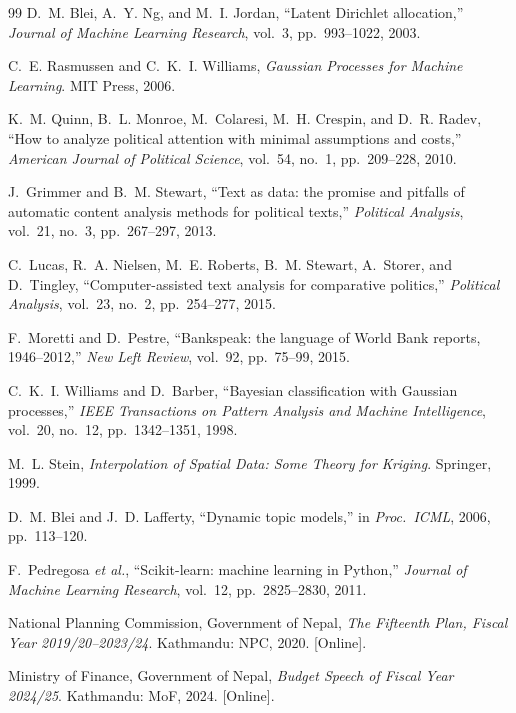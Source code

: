 \documentclass[conference]{IEEEtran}
\begin{document}
\begin{thebibliography}{99}
 D.~M. Blei, A.~Y. Ng, and M.~I. Jordan,
``Latent Dirichlet allocation,'' \emph{Journal of Machine Learning
Research}, vol.~3, pp.~993--1022, 2003.

 C.~E. Rasmussen and C.~K.~I. Williams,
\emph{Gaussian Processes for Machine Learning}. MIT Press, 2006.

 K.~M. Quinn, B.~L. Monroe, M.~Colaresi,
M.~H. Crespin, and D.~R. Radev, ``How to analyze political attention
with minimal assumptions and costs,'' \emph{American Journal of
Political Science}, vol.~54, no.~1, pp.~209--228, 2010.

 J.~Grimmer and B.~M. Stewart, ``Text as
data: the promise and pitfalls of automatic content analysis methods
for political texts,'' \emph{Political Analysis}, vol.~21, no.~3,
pp.~267--297, 2013.

 C.~Lucas, R.~A. Nielsen, M.~E. Roberts,
B.~M. Stewart, A.~Storer, and D.~Tingley, ``Computer-assisted text
analysis for comparative politics,'' \emph{Political Analysis},
vol.~23, no.~2, pp.~254--277, 2015.

 F.~Moretti and D.~Pestre, ``Bankspeak: the
language of World Bank reports, 1946--2012,'' \emph{New Left Review},
vol.~92, pp.~75--99, 2015.

 C.~K.~I. Williams and D.~Barber,
``Bayesian classification with Gaussian processes,'' \emph{IEEE
Transactions on Pattern Analysis and Machine Intelligence}, vol.~20,
no.~12, pp.~1342--1351, 1998.

 M.~L. Stein,
\emph{Interpolation of Spatial Data: Some Theory for Kriging}.
Springer, 1999.

 D.~M. Blei and J.~D. Lafferty, ``Dynamic
topic models,'' in \emph{Proc.\ ICML}, 2006, pp.~113--120.

 F.~Pedregosa \textit{et al.},
``Scikit-learn: machine learning in Python,'' \emph{Journal of
Machine Learning Research}, vol.~12, pp.~2825--2830, 2011.

 National Planning Commission, Government of Nepal,
\emph{The Fifteenth Plan, Fiscal Year 2019/20--2023/24}.
Kathmandu: NPC, 2020. [Online].

 Ministry of Finance, Government of Nepal,
\emph{Budget Speech of Fiscal Year 2024/25}.  Kathmandu: MoF, 2024.
[Online].
\end{thebibliography}
\end{document}
